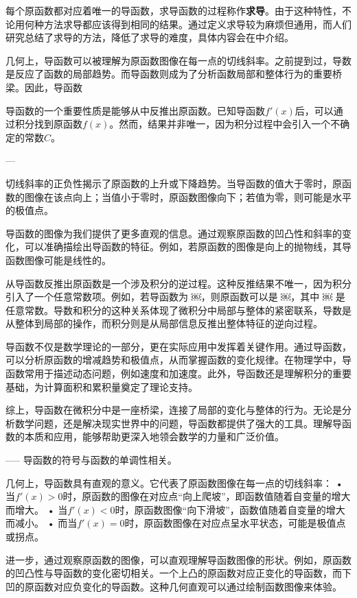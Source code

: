每个原函数都对应着唯一的导函数，求导函数的过程称作\textbf{求导}。由于这种特性，不论用何种方法求导都应该得到相同的结果。通过定义求导较为麻烦但通用，而人们研究总结了求导的方法，降低了求导的难度，具体内容会在中介绍。

几何上，导函数可以被理解为原函数图像在每一点的切线斜率。之前提到过，导数是反应了函数的局部趋势。而导函数则成为了分析函数局部和整体行为的重要桥梁。因此，导函数


导函数的一个重要性质是能够从中反推出原函数。已知导函数$f'(x)$后，可以通过积分找到原函数$f(x)$。然而，结果并非唯一，因为积分过程中会引入一个不确定的常数$C$。



---


切线斜率的正负性揭示了原函数的上升或下降趋势。当导函数的值大于零时，原函数的图像在该点向上；当值小于零时，原函数图像向下；若值为零，则可能是水平的极值点。

导函数的图像为我们提供了更多直观的信息。通过观察原函数的凹凸性和斜率的变化，可以准确描绘出导函数的特征。例如，若原函数的图像是向上的抛物线，其导函数图像可能是线性的。

从导函数反推出原函数是一个涉及积分的逆过程。这种反推结果不唯一，因为积分引入了一个任意常数项。例如，若导函数为 ￼，则原函数可以是 ￼，其中 ￼ 是任意常数。导数和积分的这种关系体现了微积分中局部与整体的紧密联系，导数是从整体到局部的操作，而积分则是从局部信息反推出整体特征的逆向过程。

导函数不仅是数学理论的一部分，更在实际应用中发挥着关键作用。通过导函数，可以分析原函数的增减趋势和极值点，从而掌握函数的变化规律。在物理学中，导函数常用于描述动态问题，例如速度和加速度。此外，导函数还是理解积分的重要基础，为计算面积和累积量奠定了理论支持。

综上，导函数在微积分中是一座桥梁，连接了局部的变化与整体的行为。无论是分析数学问题，还是解决现实世界中的问题，导函数都提供了强大的工具。理解导函数的本质和应用，能够帮助更深入地领会数学的力量和广泛价值。

-----
导函数的符号与函数的单调性相关。

几何上，导函数具有直观的意义。它代表了原函数图像在每一点的切线斜率：
	•	当$f'(x) > 0$时，原函数的图像在对应点“向上爬坡”，即函数值随着自变量的增大而增大。
	•	当$f'(x) < 0$时，原函数图像“向下滑坡”，函数值随着自变量的增大而减小。
	•	而当$f'(x) = 0$时，原函数图像在对应点呈水平状态，可能是极值点或拐点。

进一步，通过观察原函数的图像，可以直观理解导函数图像的形状。例如，原函数的凹凸性与导函数的变化密切相关。一个上凸的原函数对应正变化的导函数，而下凹的原函数对应负变化的导函数。这种几何直观可以通过绘制函数图像来体验。



